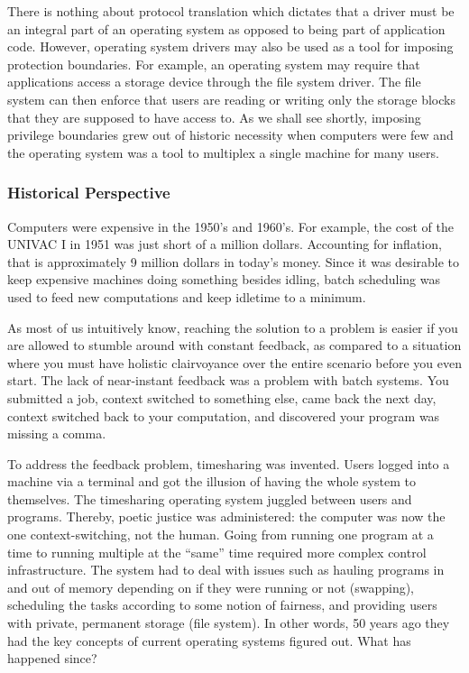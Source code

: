 There is nothing about protocol translation which dictates that a driver
must be an integral part of an operating system as opposed to being part
of application code.  However, operating system drivers may also be used
as a tool for imposing protection boundaries.  For example, an operating
system may require that applications access a storage device through
the file system driver.  The file system can then enforce that users
are reading or writing only the storage blocks that they are supposed to
have access to.  As we shall see shortly, imposing privilege boundaries
grew out of historic necessity when computers were few and the operating
system was a tool to multiplex a single machine for many users.


\subsubsection{Historical Perspective}

Computers were expensive in the 1950's and 1960's.  For example, the cost of
the UNIVAC I in 1951 was just short of a million dollars.  Accounting for
inflation, that is approximately 9 million dollars in today's money.
Since it was desirable to keep expensive machines doing something
besides idling, batch scheduling was used to feed new computations and
keep idletime to a minimum.

As most of us intuitively know, reaching the solution to a problem is
easier if you are allowed to stumble around with constant feedback, as
compared to a situation where you must have holistic clairvoyance over the
entire scenario before you even start.  The lack of near-instant feedback
was a problem with batch systems.  You submitted a job, context switched
to something else, came back the next day, context switched back to your
computation, and discovered your program was missing a comma.

To address the feedback problem, timesharing was invented.  Users logged
into a machine via a terminal and got the illusion of having the whole
system to themselves.  The timesharing operating system juggled between
users and programs.  Thereby, poetic justice was administered: the
computer was now the one context-switching, not the human.  Going from
running one program at a time to running multiple at the ``same'' time
required more complex control infrastructure.  The system had to deal
with issues such as hauling programs in and out of memory depending on
if they were running or not (swapping), scheduling the tasks according
to some notion of fairness, and providing users with private, permanent
storage (file system).  In other words, 50 years ago they had the key
concepts of current operating systems figured out.  What has happened
since?

